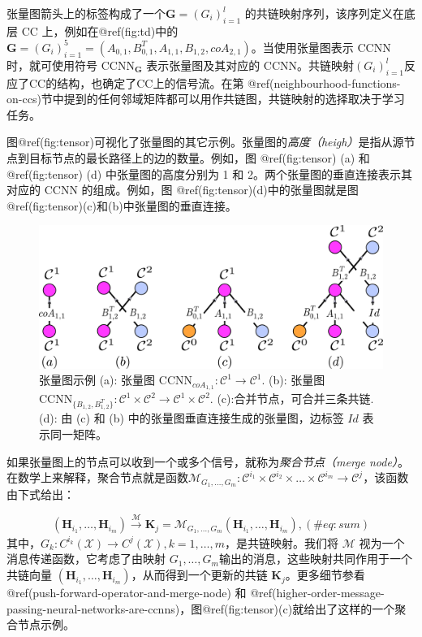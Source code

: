 \documentclass[
  12pt,
]{krantz}
\begin{document}
张量图箭头上的标签构成了一个\(\mathbf{G}= (G_i)_{i=1}^l\)
的共链映射序列，该序列定义在底层 CC
上，例如在@ref(fig:td)中的\(\mathbf{G}=(G_i)_{i=1}^5 = (A_{0,1}, B_{0,1}^{T}, A_{1,1}, B_{1,2}, coA_{2,1})\)。当使用张量图表示
CCNN 时，就可使用符号 \(\mbox{CCNN}_{\mathbf{G}}\) 表示张量图及其对应的
CCNN。共链映射\((G_i)_{i=1}^l\)反应了CC的结构，也确定了CC上的信号流。在第
@ref(neighbourhood-functions-on-ccs)节中提到的任何邻域矩阵都可以用作共链图，共链映射的选择取决于学习任务。

图@ref(fig:tensor)可视化了张量图的其它示例。张量图的\emph{高度（heigh）}是指从源节点到目标节点的最长路径上的边的数量。例如，图
@ref(fig:tensor) (a) 和 @ref(fig:tensor) (d) 中张量图的高度分别为 1 和
2。两个张量图的垂直连接表示其对应的 CCNN 的组成。例如，图
@ref(fig:tensor)(d)中的张量图就是图
@ref(fig:tensor)(c)和(b)中张量图的垂直连接。

\begin{figure}

{\centering \includegraphics{figures/hon_example} 

}

\caption{张量图示例 (a): 张量图 $\mbox{CCNN}_{coA_{1,1}}\colon \mathcal{C}^1 \to \mathcal{C}^1$. (b): 张量图 $\mbox{CCNN}_{ \{B_{1,2}, B_{1,2}^T\}} \colon \mathcal{C}^1 \times \mathcal{C}^2 \to \mathcal{C}^1 \times \mathcal{C}^2$. (c):合并节点，可合并三条共链. (d): 由 (c) 和 (b) 中的张量图垂直连接生成的张量图，边标签 $Id$ 表示同一矩阵。}\label{fig:tensor}
\end{figure}

如果张量图上的节点可以收到一个或多个信号，就称为\emph{聚合节点（merge
node）}。在数学上来解释，聚合节点就是函数\(\mathcal{M}_{G_1,\ldots ,G_m}\colon \mathcal{C}^{i_1}\times\mathcal{C}^{i_2}\times \ldots \times \mathcal{C}^{i_m} \to \mathcal{C}^{j}\)，该函数由下式给出：

\begin{equation}
    (\mathbf{H}_{i_1},\ldots,\mathbf{H}_{i_m}) \xrightarrow[]{\mathcal{M}} \mathbf{K}_{j}=
    \mathcal{M}_{G_1,\ldots,G_m}(\mathbf{H}_{i_1},\ldots,\mathbf{H}_{i_m}),
    (\#eq:sum)
\end{equation}
其中，\(G_k \colon C^{i_k}(\mathcal{X})\to C^{j}(\mathcal{X}), k=1,\ldots,m\)，是共链映射。我们将
\(\mathcal{M}\) 视为一个消息传递函数，它考虑了由映射
\(G_1,\ldots,G_m\)输出的消息，这些映射共同作用于一个共链向量
\((\mathbf{H}_{i_1},\ldots,\mathbf{H}_{i_m})\)，从而得到一个更新的共链
\(\mathbf{K}_{j}\)。更多细节参看@ref(push-forward-operator-and-merge-node)
和
@ref(higher-order-message-passing-neural-networks-are-ccnns)，图@ref(fig:tensor)(c)就给出了这样的一个聚合节点示例。
\end{document}
